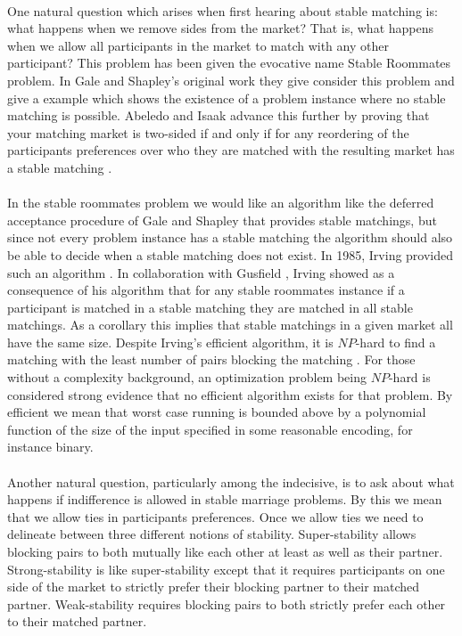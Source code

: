 \paragraph{}
One natural question which arises when first hearing about stable matching is: what happens when we remove sides from the market? That is, what happens when we allow all participants in the market to match with any other participant? This problem has been given the evocative name Stable Roommates problem. In Gale and Shapley's original work \cite{gale1962college} they give consider this problem and give a example which shows the existence of a problem instance where no stable matching is possible.  Abeledo and Isaak advance this further by proving that your matching market is two-sided if and only if for any reordering of the participants preferences over who they are matched with the resulting market has a stable matching \cite{abeledo1991characterization}.
\paragraph{}
In the stable roommates problem we would like an algorithm like the deferred acceptance procedure of Gale and Shapley that provides stable matchings, but since not every problem instance has a stable matching the algorithm should also be able to decide when a stable matching does not exist. In 1985, Irving provided such an algorithm \cite{irving1985efficient}. In collaboration with Gusfield \cite{irving1987efficient}, Irving showed as a consequence of his algorithm that for any stable roommates instance if a participant is matched in a stable matching they are matched in all stable matchings. As a corollary this implies that stable matchings in a given market all have the same size. Despite Irving's efficient algorithm, it is $NP$-hard to find a matching with the least number of pairs blocking the matching \cite{abraham2005almost}. For those without a complexity background, an optimization problem being $NP$-hard is considered strong evidence that no efficient algorithm exists for that problem. By efficient we mean that worst case running is bounded above by a polynomial function of the size of the input specified in some reasonable encoding, for instance binary.
\paragraph{}
Another natural question, particularly among the indecisive, is to ask about what happens if indifference is allowed in stable marriage problems. By this we mean that we allow ties in participants preferences. Once we allow ties we need to delineate between three different notions of stability. Super-stability allows blocking pairs to both mutually like each other at least as well as their partner. Strong-stability is like super-stability except that it requires participants on one side of the market to strictly prefer their blocking partner to their matched partner. Weak-stability requires blocking pairs to both strictly prefer each other to their matched partner. 
